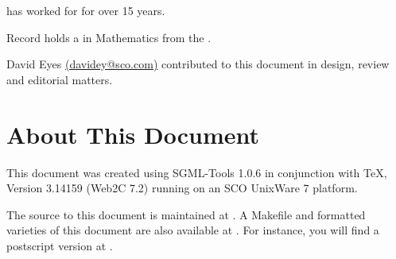 \documentclass[letterpaper]{article}
\begin{document}
 has worked for 
for over 15 years.  

Record holds a 
in Mathematics from the 
.

David Eyes 
{\ttfamily \url{(davidey@sco.com)}}
contributed to this document in design, review and editorial matters.




\section{About This Document}

This document was created using SGML-Tools 1.0.6 in conjunction with TeX, 
Version 3.14159 (Web2C 7.2) running on an SCO UnixWare 7 platform. 

The source to this document is maintained at
.
A Makefile and formatted varieties of this document are also available at
. For instance,
you will find a postscript version at
.
\end{document}
